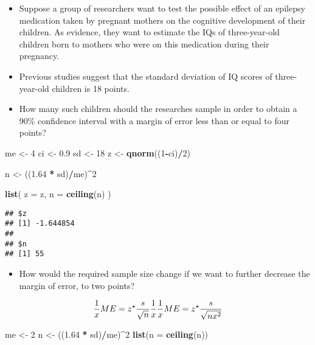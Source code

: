 \documentclass[]{book}
\newenvironment{Shaded}{\begin{snugshade}}{\end{snugshade}}
\newcommand{\DataTypeTok}[1]{\textcolor[rgb]{0.13,0.29,0.53}{#1}}
\newcommand{\DecValTok}[1]{\textcolor[rgb]{0.00,0.00,0.81}{#1}}
\newcommand{\FloatTok}[1]{\textcolor[rgb]{0.00,0.00,0.81}{#1}}
\newcommand{\KeywordTok}[1]{\textcolor[rgb]{0.13,0.29,0.53}{\textbf{#1}}}
\newcommand{\NormalTok}[1]{#1}
\newcommand{\OperatorTok}[1]{\textcolor[rgb]{0.81,0.36,0.00}{\textbf{#1}}}
\newcommand{\StringTok}[1]{\textcolor[rgb]{0.31,0.60,0.02}{#1}}
\providecommand{\tightlist}{%
  \setlength{\itemsep}{0pt}\setlength{\parskip}{0pt}}
\begin{document}
\begin{itemize}
\item
  Suppose a group of researchers want to test the possible effect of an epilepsy medication taken by pregnant mothers on the cognitive development of their children. As evidence, they want to estimate the IQs of three-year-old children born to mothers who were on this medication during their pregnancy.
\item
  Previous studies suggest that the standard deviation of IQ scores of three-year-old children is 18 points.
\item
  How many such children should the researches sample in order to obtain a 90\% confidence interval with a margin of error less than or equal to four points?
\end{itemize}

\begin{Shaded}
\begin{Highlighting}[]
\NormalTok{me <-}\StringTok{ }\DecValTok{4}  
\NormalTok{ci <-}\StringTok{ }\FloatTok{0.9}  
\NormalTok{sd <-}\StringTok{ }\DecValTok{18} 
\NormalTok{z <-}\StringTok{ }\KeywordTok{qnorm}\NormalTok{((}\DecValTok{1}\OperatorTok{-}\NormalTok{ci)}\OperatorTok{/}\DecValTok{2}\NormalTok{)}

\NormalTok{n <-}\StringTok{ }\NormalTok{((}\FloatTok{1.64} \OperatorTok{*}\StringTok{ }\NormalTok{sd)}\OperatorTok{/}\NormalTok{me)}\OperatorTok{^}\DecValTok{2}

\KeywordTok{list}\NormalTok{(}
  \DataTypeTok{z =}\NormalTok{ z,}
  \DataTypeTok{n =} \KeywordTok{ceiling}\NormalTok{(n)}
\NormalTok{)}
\end{Highlighting}
\end{Shaded}

\begin{verbatim}
## $z
## [1] -1.644854
## 
## $n
## [1] 55
\end{verbatim}

\begin{itemize}
\tightlist
\item
  How would the required sample size change if we want to further decrease the margin of error, to two points?
\end{itemize}

\[ 
\frac{1}{x} ME = z^\star \frac{s}{\sqrt{n}} \frac{1}{x}
\\
\frac{1}{x} ME = z^\star \frac{s}{\sqrt{n x^2}} 
\]

\begin{Shaded}
\begin{Highlighting}[]
\NormalTok{me <-}\StringTok{ }\DecValTok{2}
\NormalTok{n <-}\StringTok{ }\NormalTok{((}\FloatTok{1.64} \OperatorTok{*}\StringTok{ }\NormalTok{sd)}\OperatorTok{/}\NormalTok{me)}\OperatorTok{^}\DecValTok{2}
\KeywordTok{list}\NormalTok{(}\DataTypeTok{n =} \KeywordTok{ceiling}\NormalTok{(n))}
\end{Highlighting}
\end{Shaded}
\end{document}
